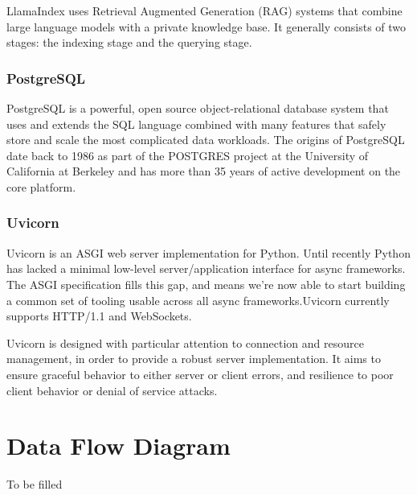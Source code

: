 LlamaIndex uses Retrieval Augmented Generation (RAG) systems that combine large language models with a private knowledge base. It generally consists of two stages: the indexing stage and the querying stage.\cite{datacamp}

\subsubsection{PostgreSQL}

PostgreSQL is a powerful, open source object-relational database system that uses and extends the SQL language combined with many features that safely store and scale the most complicated data workloads. The origins of PostgreSQL date back to 1986 as part of the POSTGRES project at the University of California at Berkeley and has more than 35 years of active development on the core platform.\cite{postgres}

\subsubsection{Uvicorn}
Uvicorn is an ASGI web server implementation for Python. Until recently Python has lacked a minimal low-level server/application interface for async frameworks. The ASGI specification fills this gap, and means we're now able to start building a common set of tooling usable across all async frameworks.Uvicorn currently supports HTTP/1.1 and WebSockets.

Uvicorn is designed with particular attention to connection and resource management, in order to provide a robust server implementation. It aims to ensure graceful behavior to either server or client errors, and resilience to poor client behavior or denial of service attacks.\cite{uvicorn}

\section{Data Flow Diagram}
To be filled 

